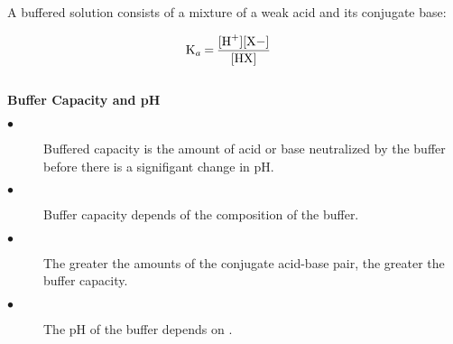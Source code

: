 \documentclass{article}
\begin{document}
 \noindent
 A buffered solution consists of a mixture of a weak acid and its conjugate base:

 \begin{center}
 \end{center}

 \begin{align*}
   \ce{K_a &= \frac{[H+][X-]}{[HX]}}
 \end{align*}
\\
\textbf{Buffer Capacity and pH}
\\
\begin{description}
\item[$\bullet$]\noindent Buffered capacity is the amount of acid or base neutralized by the buffer before there is a signifigant change in pH.
\item[$\bullet$]\noindent Buffer capacity depends of the composition of the buffer.
\item[$\bullet$]\noindent The greater the amounts of the conjugate acid-base pair, the greater the buffer capacity.
\item[$\bullet$]\noindent The pH of the buffer depends on .
\end{description}
\end{document}
